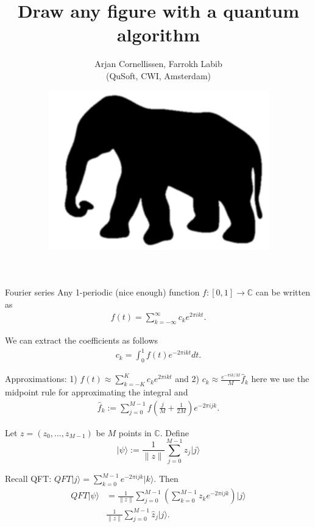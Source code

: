 \documentclass[english]{beamer}
\newcommand{\ket}[1]{\vert#1\rangle}
\newcommand{\norm}[1]{\lVert#1\rVert}
\newcommand{\C}{\mathbb{C}}
\begin{document}
\title{Draw any figure with a quantum algorithm}
\author{Arjan Cornellissen, Farrokh Labib\\ (QuSoft, CWI, Amsterdam)}

\date{
\includegraphics[scale=0.20]{elephant.png}
}

\maketitle


\begin{frame}{Fourier series}
  Any 1-periodic (nice enough) function $f\colon [0,1]\to \C$ can be written as
  \begin{align*}
   f(t) = \sum_{k=-\infty}^{\infty}c_ke^{2\pi i k t}.
  \end{align*}

  \pause
  We can extract the coefficients as follows
  \begin{align*}
   c_k = \int_{0}^1f(t)e^{-2\pi i k t}dt.
  \end{align*}

  \pause
  Approximations: 1) $f(t) \approx \sum_{k=-K}^Kc_ke^{2\pi i k t}$ and 2) $c_k \approx \frac{e^{-\pi i k/M}}{M}\hat{f}_k$
  here we use the midpoint rule for approximating the integral and
  \begin{align*}
   \hat{f}_k:=\sum_{j=0}^{M-1}f(\frac{j}{M}+\frac{1}{2M})e^{-2\pi i jk}.
  \end{align*}
  
\end{frame}

\begin{frame}
 Let $z=(z_0,\dots,z_{M-1})$ be $M$ points in $\C$. Define $$\ket{\psi}:=\frac{1}{\norm{z}}\sum_{j=0}^{M-1}z_j\ket{j}$$
 
 \pause
 Recall QFT: $QFT\ket{j}=\sum_{k=0}^{M-1}e^{-2\pi i j k }\ket{k}$. Then
 \begin{align*}
  QFT\ket{\psi}&=\frac{1}{\norm{z}}\sum_{j=0}^{M-1}\left(\sum_{k=0}^{M-1}z_ke^{-2\pi i j k}\right)\ket{j}\\
  &\frac{1}{\norm{z}}\sum_{j=0}^{M-1}\hat{z}_{j}\ket{j}.
 \end{align*}

\end{frame}
\end{document}
